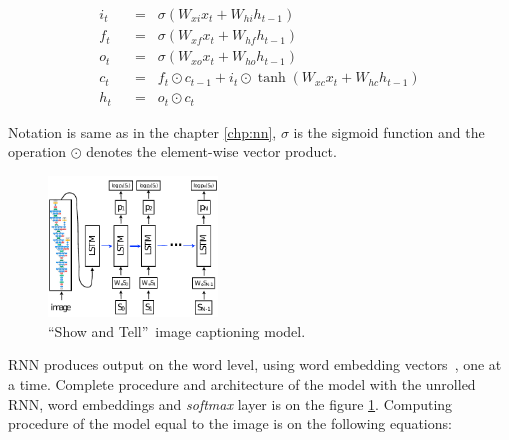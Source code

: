 \belowdisplayskip=24pt
\begin{align}
i_t \hspace{7pt}&=\hspace{7pt} \sigma(W_{xi}x_t + W_{hi}h_{t-1}) \label{eq:showlstm1}\\
f_t \hspace{7pt}&=\hspace{7pt} \sigma(W_{xf}x_t + W_{hf}h_{t-1}) \label{eq:showlstm2}\\
o_t \hspace{7pt}&=\hspace{7pt} \sigma(W_{xo}x_t + W_{ho}h_{t-1}) \label{eq:showlstm3}\\
c_t \hspace{7pt}&=\hspace{7pt} f_t\odot c_{t-1} + i_t\odot\tanh(W_{xc}x_t + W_{hc}h_{t-1}) \label{eq:showlstm4}\\
h_t \hspace{7pt}&=\hspace{7pt} o_t\odot c_t \label{eq:showlstm5}
\end{align}

Notation is same as in the chapter \ref{chp:nn}, $ \sigma $ is the sigmoid function and the operation $ \odot $ denotes the element-wise vector product.

\begin{figure}[!t]
	\centering
	\includegraphics[width=0.4\textwidth]{./fig/show-tell_model.pdf}
	\caption{\textquotedblleft Show and Tell\textquotedblright\ image captioning model.~\cite{DBLP:journals/corr/VinyalsTBE14}
		\label{fig:showmodel}}
\end{figure}

RNN produces output on the word level, using word embedding vectors~\cite{DBLP:journals/corr/abs-1301-3781}, one at a time. Complete procedure and architecture of the model with the unrolled RNN, word embeddings and \emph{softmax} layer is on the figure \ref{fig:showmodel}. Computing procedure of the model equal to the image is on the following equations:

